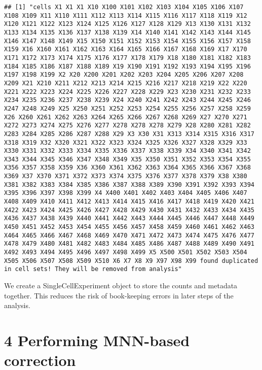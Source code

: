 \documentclass[]{article}
\begin{document}
\begin{verbatim}
## [1] "cells X1 X1 X1 X10 X100 X101 X102 X103 X104 X105 X106 X107 X108 X109 X11 X110 X111 X112 X113 X114 X115 X116 X117 X118 X119 X12 X120 X121 X122 X123 X124 X125 X126 X127 X128 X129 X13 X130 X131 X132 X133 X134 X135 X136 X137 X138 X139 X14 X140 X141 X142 X143 X144 X145 X146 X147 X148 X149 X15 X150 X151 X152 X153 X154 X155 X156 X157 X158 X159 X16 X160 X161 X162 X163 X164 X165 X166 X167 X168 X169 X17 X170 X171 X172 X173 X174 X175 X176 X177 X178 X179 X18 X180 X181 X182 X183 X184 X185 X186 X187 X188 X189 X19 X190 X191 X192 X193 X194 X195 X196 X197 X198 X199 X2 X20 X200 X201 X202 X203 X204 X205 X206 X207 X208 X209 X21 X210 X211 X212 X213 X214 X215 X216 X217 X218 X219 X22 X220 X221 X222 X223 X224 X225 X226 X227 X228 X229 X23 X230 X231 X232 X233 X234 X235 X236 X237 X238 X239 X24 X240 X241 X242 X243 X244 X245 X246 X247 X248 X249 X25 X250 X251 X252 X253 X254 X255 X256 X257 X258 X259 X26 X260 X261 X262 X263 X264 X265 X266 X267 X268 X269 X27 X270 X271 X272 X273 X274 X275 X276 X277 X278 X278 X278 X279 X28 X280 X281 X282 X283 X284 X285 X286 X287 X288 X29 X3 X30 X31 X313 X314 X315 X316 X317 X318 X319 X32 X320 X321 X322 X323 X324 X325 X326 X327 X328 X329 X33 X330 X331 X332 X333 X334 X335 X336 X337 X338 X339 X34 X340 X341 X342 X343 X344 X345 X346 X347 X348 X349 X35 X350 X351 X352 X353 X354 X355 X356 X357 X358 X359 X36 X360 X361 X362 X363 X364 X365 X366 X367 X368 X369 X37 X370 X371 X372 X373 X374 X375 X376 X377 X378 X379 X38 X380 X381 X382 X383 X384 X385 X386 X387 X388 X389 X390 X391 X392 X393 X394 X395 X396 X397 X398 X399 X4 X400 X401 X402 X403 X404 X405 X406 X407 X408 X409 X410 X411 X412 X413 X414 X415 X416 X417 X418 X419 X420 X421 X422 X423 X424 X425 X426 X427 X428 X429 X430 X431 X432 X433 X434 X435 X436 X437 X438 X439 X440 X441 X442 X443 X444 X445 X446 X447 X448 X449 X450 X451 X452 X453 X454 X455 X456 X457 X458 X459 X460 X461 X462 X463 X464 X465 X466 X467 X468 X469 X470 X471 X472 X473 X474 X475 X476 X477 X478 X479 X480 X481 X482 X483 X484 X485 X486 X487 X488 X489 X490 X491 X492 X493 X494 X495 X496 X497 X498 X499 X5 X500 X501 X502 X503 X504 X505 X506 X507 X508 X509 X510 X6 X7 X8 X9 X97 X98 X99 found duplicated in cell sets! They will be removed from analysis"
\end{verbatim}

We create a SingleCellExperiment object to store the counts and metadata
together. This reduces the risk of book-keeping errors in later steps of
the analysis.

\section{4 Performing MNN-based
correction}\label{performing-mnn-based-correction}
\end{document}
